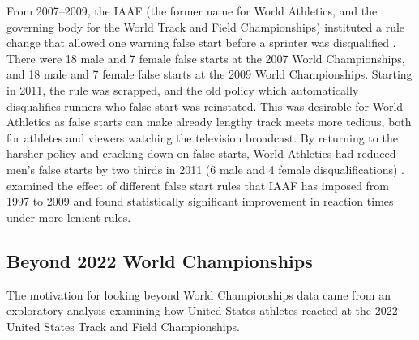\documentclass[12pt, letterpaper, titlepage]{article}
\begin{document}
From 2007--2009, the IAAF (the former name for World Athletics, and the 
governing body for the World Track and Field Championships) instituted a rule 
change that allowed one warning false start before a sprinter was disqualified 
\citep{iaaf2009falsestart}. There were 18 male and 7 female false starts at the 
2007 World Championships, and 18 male and 7 female false starts at the 2009 World 
Championships. Starting in 2011, the rule was scrapped, and the old policy which
automatically disqualifies runners who false start was reinstated. This was 
desirable for World Athletics as false starts can make already lengthy track 
meets more tedious, both for athletes and viewers watching the television 
broadcast. By returning to the harsher policy and cracking down on false starts,
World Athletics had reduced men's false starts by two thirds in 2011 (6 male and
4 female disqualifications) \citep{iaaf2009falsestart}. \citet{haugen2013effect}
examined the effect of different false start rules that IAAF has imposed from 
1997 to 2009 and found statistically significant improvement in reaction times 
under more lenient rules.




\subsection{Beyond 2022 World Championships}\label{sec:databeyond}
The motivation for looking beyond World Championships data came from an 
exploratory analysis examining how United States athletes reacted at the 
2022 United States Track and Field Championships.
\end{document}
